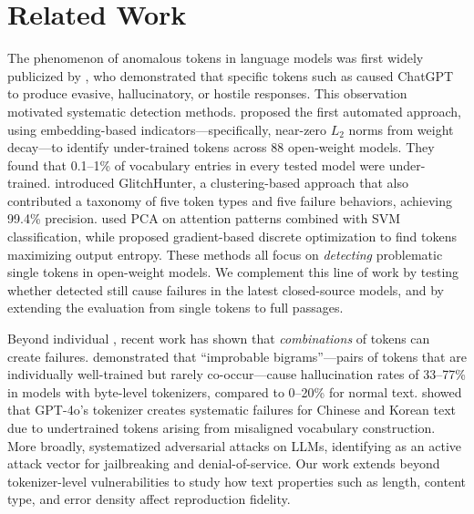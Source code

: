 \section{Related Work}
\label{sec:related}

The phenomenon of anomalous tokens in language models was first widely publicized by \citet{rumbelow2023solidgoldmagikarp}, who demonstrated that specific tokens such as \magikarp caused ChatGPT to produce evasive, hallucinatory, or hostile responses. This observation motivated systematic detection methods. \citet{land2024fishing} proposed the first automated approach, using embedding-based indicators---specifically, near-zero $L_2$ norms from weight decay---to identify under-trained tokens across 88 open-weight models. They found that 0.1--1\% of vocabulary entries in every tested model were under-trained. \citet{li2024glitch} introduced GlitchHunter, a clustering-based approach that also contributed a taxonomy of five token types and five failure behaviors, achieving 99.4\% precision. \citet{zhang2024glitchprober} used PCA on attention patterns combined with SVM classification, while \citet{wu2024glitchminer} proposed gradient-based discrete optimization to find tokens maximizing output entropy. These methods all focus on \emph{detecting} problematic single tokens in open-weight models. We complement this line of work by testing whether detected \glitchtokens still cause failures in the latest closed-source models, and by extending the evaluation from single tokens to full passages.

Beyond individual \glitchtokens, recent work has shown that \emph{combinations} of tokens can create failures. \citet{jang2024improbable} demonstrated that ``improbable bigrams''---pairs of tokens that are individually well-trained but rarely co-occur---cause hallucination rates of 33--77\% in models with byte-level tokenizers, compared to 0--20\% for normal text. \citet{yang2024problematic} showed that GPT-4o's tokenizer creates systematic failures for Chinese and Korean text due to undertrained tokens arising from misaligned vocabulary construction. More broadly, \citet{geiping2024coercing} systematized adversarial attacks on LLMs, identifying \glitchtokens as an active attack vector for jailbreaking and denial-of-service. Our work extends beyond tokenizer-level vulnerabilities to study how text properties such as length, content type, and error density affect reproduction fidelity.


